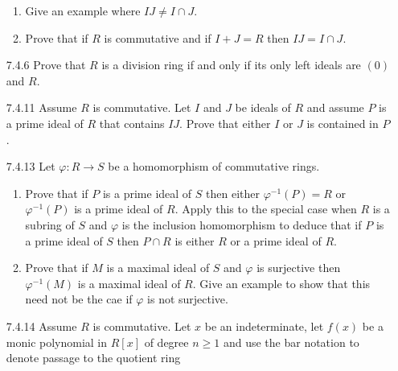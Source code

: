\documentclass[9pt]{article}
\begin{document}
\begin{enumerate}
\begin{enumerate}
                     \item Give an example where $IJ \neq I \cap J$.
                     \item Prove that if $R$ is commutative and if $I + J = R$
                           then $IJ = I \cap J$.
                  \end{enumerate}
   \item[7.4.6]   Prove that $R$ is a division ring if and only if its only left
                  ideals are $(0)$ and $R$.
   \item[7.4.11]  Assume $R$ is commutative. Let $I$ and $J$ be ideals of $R$
                  and assume $P$ is a prime ideal of $R$ that contains $IJ$.
                  Prove that either $I$ or $J$ is contained in $P$.
   \item[7.4.13]  Let $\varphi : R \rightarrow S$ be a homomorphism of
                  commutative rings.
                  \begin{enumerate}
                     \item Prove that if $P$ is a prime ideal of $S$ then either
                           $\varphi^{-1}(P) = R$ or $\varphi^{-1}(P)$ is a prime
                           ideal of $R$. Apply this to the special case when $R$
                           is a subring of $S$ and $\varphi$ is the inclusion
                           homomorphism to deduce that if $P$ is a prime ideal
                           of $S$ then $P \cap R$ is either $R$ or a prime ideal
                           of $R$.
                     \item Prove that if $M$ is a maximal ideal of $S$ and
                           $\varphi$ is surjective then $\varphi^{-1}(M)$ is a
                           maximal ideal of $R$. Give an example to show that
                           this need not be the cae if $\varphi$ is not
                           surjective.
                  \end{enumerate}
   \item[7.4.14]  Assume $R$ is commutative. Let $x$ be an indeterminate, let
                  $f(x)$ be a monic polynomial in $R[x]$ of degree $n \ge 1$ and
                  use the bar notation to denote passage to the quotient ring

\end{enumerate}
\end{document}
